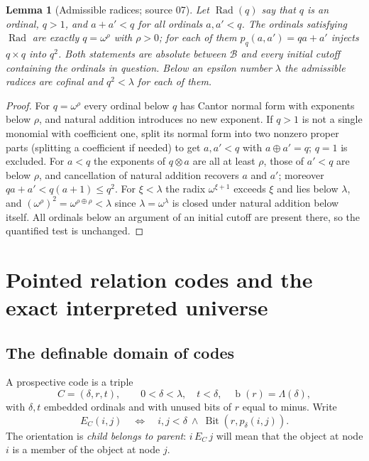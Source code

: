 \documentclass[11pt,letterpaper]{article}
\newtheorem{lemma}[lemma]{Lemma}\aliascntresetthe{lemma}
\theoremstyle{definition}
\theoremstyle{remark}
\newcommand{\bd}{\operatorname{b}}
\newcommand{\B}{\mathcal B}
\newcommand{\Bit}{\operatorname{Bit}}
\newcommand{\nsum}{\mathbin{\oplus}}
\newcommand{\nprod}{\mathbin{\otimes}}
\begin{document}
\begin{lemma}[Admissible radices; source 07]\label{hset:lem:radix}
Let $\operatorname{Rad}(q)$ say that $q$ is an ordinal, $q>1$, and $a+a'<q$ for
all ordinals $a,a'<q$. The ordinals satisfying $\operatorname{Rad}$ are exactly
$q=\omega^\rho$ with $\rho>0$; for each of them $p_q(a,a')=qa+a'$ injects
$q\times q$ into $q^2$. Both statements are absolute between $\B$ and every
initial cutoff containing the ordinals in question. Below an epsilon number
$\lambda$ the admissible radices are cofinal and $q^2<\lambda$ for each of them.
\end{lemma}
\begin{proof}
For $q=\omega^\rho$ every ordinal below $q$ has Cantor normal form with
exponents below $\rho$, and natural addition introduces no new exponent. If
$q>1$ is not a single monomial with coefficient one, split its normal form into
two nonzero proper parts (splitting a coefficient if needed) to get $a,a'<q$
with $a\nsum a'=q$; $q=1$ is excluded. For $a<q$ the exponents of $q\nprod a$
are all at least $\rho$, those of $a'<q$ are below $\rho$, and cancellation of
natural addition recovers $a$ and $a'$; moreover $qa+a'<q(a+1)\le q^2$. For
$\xi<\lambda$ the radix $\omega^{\xi+1}$ exceeds $\xi$ and lies below
$\lambda$, and $(\omega^\rho)^2=\omega^{\rho\nsum\rho}<\lambda$ since
$\lambda=\omega^\lambda$ is closed under natural addition below itself.
All ordinals below an argument of an initial cutoff are present there, so the
quantified test is unchanged.
\end{proof}

\section{Pointed relation codes and the exact interpreted universe}
\label{hset:sec:codes}

\subsection{The definable domain of codes}

A prospective code is a triple
\[
 C=(\delta,r,t),\qquad
 0<\delta<\lambda,\quad t<\delta,\quad\bd(r)=\Lambda(\delta),
\]
with $\delta,t$ embedded ordinals and with unused bits of $r$ equal to minus.
Write
\[
 E_C(i,j)\quad\Longleftrightarrow\quad
 i,j<\delta\ \land\ \Bit(r,p_\delta(i,j)).
\]
The orientation is \emph{child belongs to parent}: $i\,E_C\,j$ will mean
that the object at node $i$ is a member of the object at node $j$.
\end{document}

